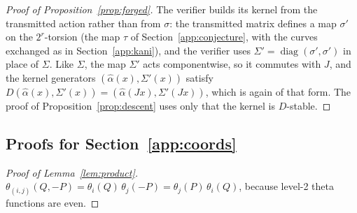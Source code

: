 \documentclass[version=preprint]{iacrcc}
\begin{document}
    \begin{proof}[Proof of Proposition~\ref{prop:forged}]
        The verifier builds its kernel from the transmitted action rather than
        from $\sigma$: the transmitted matrix defines a map $\sigma'$ on the
        $2^r$-torsion (the map $\tau$ of Section~\ref{app:conjecture}, with the
        curves exchanged as in Section~\ref{app:kani}), and the verifier uses $\Sigma' = \operatorname{diag}(\sigma',
        \sigma')$ in place of $\Sigma$. Like $\Sigma$, the map $\Sigma'$ acts
        componentwise, so it commutes with $J$, and the kernel generators
        $(\widehat{\alpha}(x), \Sigma'(x))$ satisfy $D(\widehat{\alpha}(x),
        \Sigma'(x)) = (\widehat{\alpha}(Jx), \Sigma'(Jx))$, which is again of that
        form. The proof of Proposition~\ref{prop:descent} uses only that the kernel
        is $D$-stable.
    \end{proof}

    \subsection*{Proofs for Section~\ref{app:coords}}

    \begin{proof}[Proof of Lemma~\ref{lem:product}]
        $\theta_{(i,j)}(Q, -P) = \theta_i(Q)\,\theta_j(-P) = \theta_j(P)\,
        \theta_i(Q)$, because level-2 theta functions are even.
    \end{proof}
\end{document}
